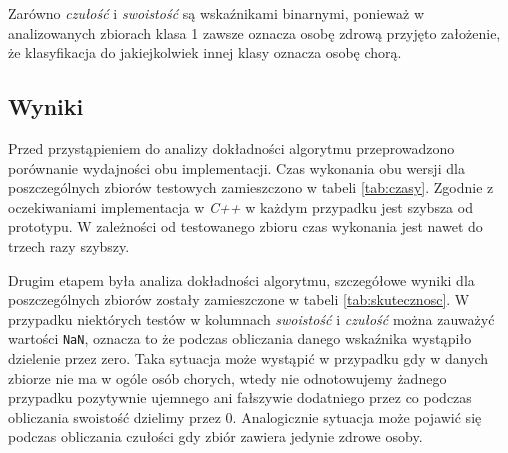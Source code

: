\noindent Zarówno \textit{czułość} i \textit{swoistość} są wskaźnikami binarnymi, ponieważ w analizowanych zbiorach klasa 1 zawsze oznacza osobę zdrową przyjęto założenie, że klasyfikacja do jakiejkolwiek innej klasy oznacza osobę chorą.

\subsection{Wyniki}
Przed przystąpieniem do analizy dokładności algorytmu przeprowadzono porównanie wydajności obu implementacji. Czas wykonania obu wersji dla poszczególnych zbiorów testowych zamieszczono w tabeli \ref{tab:czasy}. Zgodnie z oczekiwaniami implementacja w \textit{C++} w każdym przypadku jest szybsza od prototypu. W zależności od testowanego zbioru czas wykonania jest nawet do trzech razy szybszy.

Drugim etapem była analiza dokładności algorytmu, szczegółowe wyniki dla poszczególnych zbiorów zostały zamieszczone w tabeli \ref{tab:skutecznosc}.
W przypadku niektórych testów w kolumnach \textit{swoistość} i \textit{czułość} można zauważyć wartości \texttt{NaN}, oznacza to że podczas obliczania danego wskaźnika wystąpiło dzielenie przez zero. Taka sytuacja może wystąpić w przypadku gdy w danych zbiorze nie ma w ogóle osób chorych, wtedy nie odnotowujemy żadnego przypadku pozytywnie ujemnego ani fałszywie dodatniego przez co podczas obliczania swoistość dzielimy przez 0.  Analogicznie sytuacja może pojawić się podczas obliczania czułości gdy zbiór zawiera jedynie zdrowe osoby.


